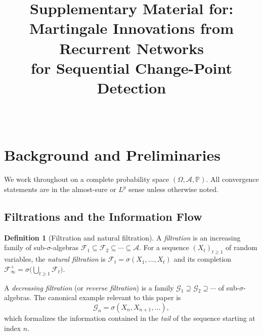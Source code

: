 \documentclass[bj,authoryear]{imsart}
\theoremstyle{plain}
\theoremstyle{definition}
\newtheorem{definition}{Definition}[section]
\newcommand{\Prob}{\mathbb{P}}
\newcommand{\F}{\mathcal{F}}
\newcommand{\G}{\mathcal{G}}
\newcommand{\A}{\mathcal{A}}
\begin{document}
\begin{frontmatter}
\title{Supplementary Material for:\\[0.3em]
  Martingale Innovations from Recurrent Networks\\[0.1em]
  for Sequential Change-Point Detection}
\author{~}
\end{frontmatter}

\setcounter{section}{0}
\renewcommand{\thesection}{\Alph{section}}
\renewcommand{\theequation}{\Alph{section}.\arabic{equation}}
\renewcommand{\thetable}{\Alph{section}.\arabic{table}}
\renewcommand{\thefigure}{\Alph{section}.\arabic{figure}}
\renewcommand{\thetheorem}{\Alph{section}.\arabic{theorem}}

\section{Background and Preliminaries}
\label{app:background}

We work throughout on a complete probability space $(\Omega, \A, \Prob)$.
All convergence statements are in the almost-sure or $L^p$ sense unless otherwise noted.

\subsection{Filtrations and the Information Flow}

\begin{definition}[Filtration and natural filtration]
\label{def:filtration}
  A \emph{filtration} is an increasing family of sub-$\sigma$-algebras
  $\F_1 \subseteq \F_2 \subseteq \cdots \subseteq \A$.
  For a sequence $(X_t)_{t\geq 1}$ of random variables, the
  \emph{natural filtration} is $\F_t = \sigma(X_1, \ldots, X_t)$ and its
  completion $\F_\infty^+ = \sigma\bigl(\bigcup_{t\geq 1}\F_t\bigr)$.
\end{definition}

A \emph{decreasing filtration} (or \emph{reverse filtration}) is a family
$\G_1 \supseteq \G_2 \supseteq \cdots$ of sub-$\sigma$-algebras.
The canonical example relevant to this paper is
\begin{equation}
  \G_n = \sigma(X_n, X_{n+1}, \ldots),
  \label{eq:reverse-filtration}
\end{equation}
which formalizes the information contained in the \emph{tail} of the sequence
starting at index $n$.
\end{document}
